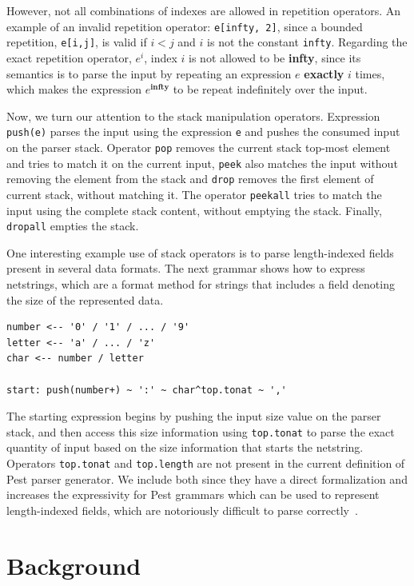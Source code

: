 \documentclass[preprint,12pt]{elsarticle}
\theoremstyle{definition}
\begin{document}
However, not all combinations of indexes are allowed in repetition operators.
An example of an invalid repetition operator: \verb|e[infty, 2]|, since a
bounded repetition, \verb|e[i,j]|, is valid if $i < j$ and $i$ is not the constant
\verb|infty|. Regarding the exact repetition operator, $e^i$, index $i$ is not allowed to
be \textbf{infty}, since its semantics is to parse the input by repeating
an expression $e$ \textbf{exactly} $i$ times, which makes the expression
$e^{\mathbf{infty}}$ to be repeat indefinitely over the input.

Now, we turn our attention to the stack manipulation operators. Expression
\verb|push(e)| parses the input using the expression \texttt{e} and pushes the
consumed input on the parser stack. Operator \verb|pop| removes the current
stack top-most element and tries to match it on the current input,
\verb|peek| also matches the input without removing the element from the
stack and \verb|drop| removes the first element of current stack, without
matching it. The operator \verb|peekall| tries to match the input using the
complete stack content, without emptying the stack. Finally, \verb|dropall|
empties the stack.

One interesting example use of stack operators is to parse
length-indexed fields present in several data formats.
The next grammar shows how to express netstrings, which are a format method
for strings that includes a field denoting the size of the represented data.
\begin{verbatim}
number <-- '0' / '1' / ... / '9'
letter <-- 'a' / ... / 'z'
char <-- number / letter

start: push(number+) ~ ':' ~ char^top.tonat ~ ','
\end{verbatim}
The starting expression begins by pushing the input size value on the parser stack,
and then access this size information using \verb|top.tonat| to parse the exact
quantity of input based on the size information that starts the netstring.
Operators \verb|top.tonat| and \verb|top.length| are not present in the current
definition of Pest parser generator. We include both since they have a direct
formalization and increases the expressivity for Pest grammars which can be used
to represent length-indexed fields, which are notoriously difficult to parse
correctly~\cite{Zhang23, Lucks17}.


\section{Background}\label{sec:background}
\end{document}
